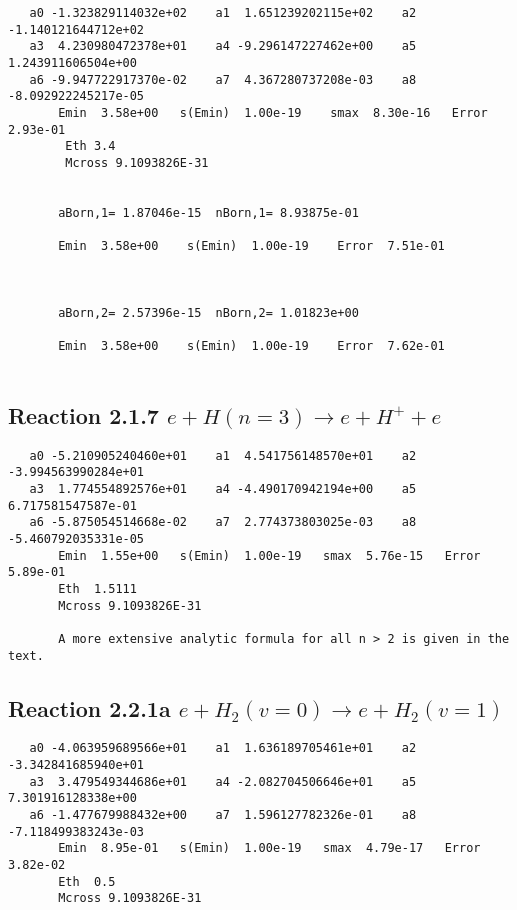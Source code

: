 \documentclass[12pt,dvipdfmx]{article}
\begin{document}
\begin{small}\begin{verbatim}
   a0 -1.323829114032e+02    a1  1.651239202115e+02    a2 -1.140121644712e+02
   a3  4.230980472378e+01    a4 -9.296147227462e+00    a5  1.243911606504e+00
   a6 -9.947722917370e-02    a7  4.367280737208e-03    a8 -8.092922245217e-05
       Emin  3.58e+00   s(Emin)  1.00e-19    smax  8.30e-16   Error  2.93e-01
        Eth 3.4
        Mcross 9.1093826E-31


       aBorn,1= 1.87046e-15  nBorn,1= 8.93875e-01

       Emin  3.58e+00    s(Emin)  1.00e-19    Error  7.51e-01



       aBorn,2= 2.57396e-15  nBorn,2= 1.01823e+00

       Emin  3.58e+00    s(Emin)  1.00e-19    Error  7.62e-01


\end{verbatim}\end{small}




\newpage
\subsection{
Reaction 2.1.7 $   e + H(n=3) \rightarrow e + H^+ + e$}



\begin{small}\begin{verbatim}
   a0 -5.210905240460e+01    a1  4.541756148570e+01    a2 -3.994563990284e+01
   a3  1.774554892576e+01    a4 -4.490170942194e+00    a5  6.717581547587e-01
   a6 -5.875054514668e-02    a7  2.774373803025e-03    a8 -5.460792035331e-05
       Emin  1.55e+00   s(Emin)  1.00e-19   smax  5.76e-15   Error  5.89e-01
       Eth  1.5111
       Mcross 9.1093826E-31

       A more extensive analytic formula for all n > 2 is given in the text.
\end{verbatim}\end{small}




\newpage
\subsection{
Reaction 2.2.1a $   e + H_2(v=0) \rightarrow e + H_2(v=1)$}



\begin{small}\begin{verbatim}
   a0 -4.063959689566e+01    a1  1.636189705461e+01    a2 -3.342841685940e+01
   a3  3.479549344686e+01    a4 -2.082704506646e+01    a5  7.301916128338e+00
   a6 -1.477679988432e+00    a7  1.596127782326e-01    a8 -7.118499383243e-03
       Emin  8.95e-01   s(Emin)  1.00e-19   smax  4.79e-17   Error  3.82e-02
       Eth  0.5
       Mcross 9.1093826E-31
\end{verbatim}\end{small}
\end{document}
